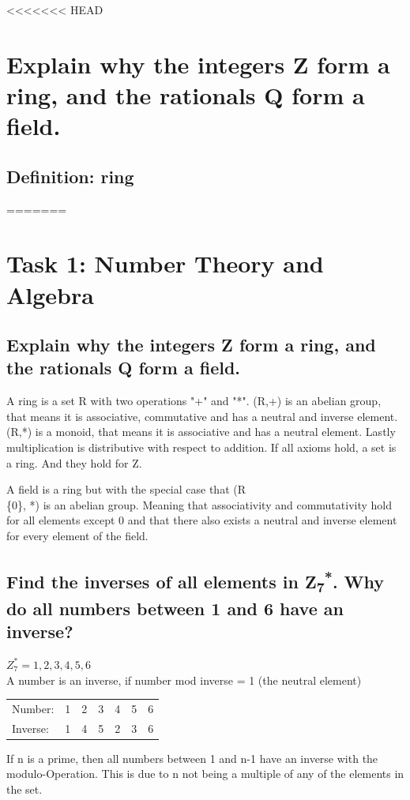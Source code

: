 <<<<<<< HEAD
\section{Explain why the integers Z form a ring, and the rationals Q form a field.}

\subsection{Definition: ring}
=======
\section{Task 1: Number Theory and Algebra}

\subsection{Explain why the integers Z form a ring, and the rationals Q form a field.}


A ring is a set R with two operations "+" and "*". (R,+) is an abelian group, that means it is associative, commutative and has a neutral and inverse element. (R,*) is a monoid, that means it is associative and has a neutral element. Lastly multiplication is distributive with respect to addition. If all axioms hold, a set is a ring. And they hold for Z.


A field is a ring but with the special case that (R \\\{0\}, *) is an abelian group. Meaning that associativity and commutativity hold for all elements except 0 and that there also exists a neutral and inverse element for every element of the field.

\subsection{Find the inverses of all elements in Z\textsubscript{7}\textsuperscript{*}. Why do all numbers between 1 and 6 have an inverse?}

$Z^*_7 = {1,2,3,4,5,6}$\\
A number is an inverse, if number mod inverse = 1 (the neutral element)

\begin{tabular}{l c c c c c c}
	Number: & 1 & 2 & 3 & 4 & 5 & 6\\
	Inverse: & 1 & 4 & 5 & 2 & 3 & 6\\
\end{tabular}

If n is a prime, then all numbers between 1 and n-1 have an inverse with the modulo-Operation. This is due to n not being a multiple of any of the elements in the set.

